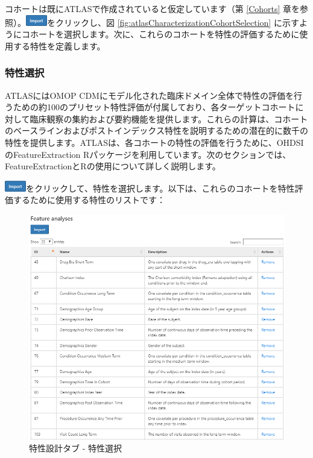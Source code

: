 \documentclass[
  11pt]{book}
\theoremstyle{definition}
\theoremstyle{definition}
\theoremstyle{definition}
\theoremstyle{definition}
\theoremstyle{remark}
\begin{document}
コホートは既にATLASで作成されていると仮定しています（第 \ref{Cohorts} 章を参照）。\includegraphics{images/Characterization/atlasImportButton.png}をクリックし、図 \ref{fig:atlasCharacterizationCohortSelection} に示すようにコホートを選択します。次に、これらのコホートを特性の評価するために使用する特性を定義します。

\subsubsection*{特性選択}\label{ux7279ux6027ux9078ux629e}

ATLASにはOMOP CDMにモデル化された臨床ドメイン全体で特性の評価を行うための約100のプリセット特性評価が付属しており、各ターゲットコホートに対して臨床観察の集約および要約機能を提供します。これらの計算は、コホートのベースラインおよびポストインデックス特性を説明するための潜在的に数千の特性を提供します。ATLASは、各コホートの特性の評価を行うために、OHDSIのFeatureExtraction Rパッケージを利用しています。次のセクションでは、FeatureExtractionとRの使用について詳しく説明します。

\includegraphics{images/Characterization/atlasImportButton.png}をクリックして、特性を選択します。以下は、これらのコホートを特性評価するために使用する特性のリストです：

\begin{figure}

{\centering \includegraphics[width=1\linewidth]{images/Characterization/atlasCharacterizationFeatureSelection} 

}

\caption{特性設計タブ - 特性選択}\label{fig:atlasCharacterizationFeatureSelection}
\end{figure}
\end{document}
